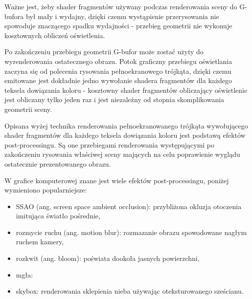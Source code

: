 Ważne jest, żeby shader fragmentów używany podczas renderowania sceny do G-bufora był mały i wydajny, dzięki czemu wystąpienie przerysowania nie spowoduje znaczącego spadku wydajności - przebieg geometrii nie wykonuje kosztownych obliczeń oświetlenia.

Po zakończeniu przebiegu geometrii G-bufor może zostać użyty do wyrenderowania ostatecznego obrazu.
Potok graficzny przebiegu oświetlania zaczyna się od polecenia rysowania pełnoekranowego trójkąta, dzięki czemu emitowane jest dokładnie jedno wywołanie shadera fragmentów dla każdego teksela dowiązania koloru - kosztowny shader fragmentów obliczający oświetlenie jest obliczany tylko jeden raz i jest niezależny od stopnia skomplikowania geometrii sceny.

Opisana wyżej technika renderowania pełnoekranowanego trójkąta wywołującego shader fragmentów dla każdego teksela dowiązania koloru jest podstawą efektów post-processingu.
Są one przebiegami renderowania występującymi po zakończeniu rysowania właściwej sceny mających na celu poprawienie wyglądu ostatecznie prezentowanego obrazu.

W grafice komputerowej znane jest wiele efektów post-processingu, poniżej wymieniono popularniejsze:
\begin{itemize}
	\item SSAO (ang. screen space ambient occlusion): przybliżona okluzja otoczenia imitująca światło pośrednie,
	\item rozmycie ruchu (ang. motion blur): rozmazanie obrazu spowodowane nagłym ruchem kamery,
	\item rozkwit (ang. bloom): poświata dookoła jasnych powierzchni,
	\item mgła:
	\item skybox: renderowania sklepienia nieba używając oteksturowanego sześcianu.
\end{itemize}

